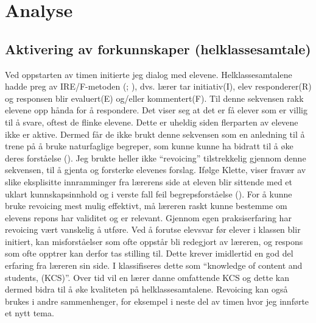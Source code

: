 \documentclass[main.tex]{subfiles}
\begin{document}
\section*{Analyse}
\label{sec:2}

\subsection*{Aktivering av forkunnskaper (helklassesamtale)}
Ved oppstarten av timen initierte jeg dialog med elevene. Helklassesamtalene hadde preg av
IRE/F-metoden (; ), dvs. lærer tar initiativ(I), elev 
responderer(R) og responsen blir evaluert(E) og/eller kommentert(F). Til denne sekvensen rakk 
elevene opp hånda for å respondere. Det viser seg at det er få elever som er villig til å svare, 
oftest de flinke elevene. Dette er uheldig siden flerparten av elevene ikke er aktive. Dermed 
får de ikke brukt denne sekvensen som en anledning til å trene på å bruke naturfaglige begreper, 
som kunne kunne ha bidratt til å øke deres forståelse ().
\newline
\newline
Jeg brukte heller ikke ``revoicing'' tilstrekkelig gjennom denne sekvensen, til å gjenta og 
forsterke elevenes forslag. Ifølge Klette, viser fravær av slike eksplisitte 
innramminger fra lærerens side at eleven blir sittende med et uklart kunnskapsinnhold og i 
verste fall feil begrepsforståelse (). For å kunne bruke revoicing 
mest mulig effektivt, må læreren raskt kunne bestemme om elevens repons har validitet 
og er relevant. Gjennom egen praksiserfaring har revoicing vært vanskelig å utføre.
Ved å forutse elevsvar før elever i klassen blir initiert, kan misforståelser som ofte oppstår bli 
redegjort av læreren, og respons som ofte opptrer kan derfor tas stilling til. Dette krever imidlertid 
en god del erfaring fra læreren sin side. I  klassifiseres dette som 
``knowledge of content and students, (KCS)''. Over tid vil en lærer danne omfattende KCS og
dette kan dermed bidra til å øke kvaliteten på helklassesamtalene. Revoicing kan også brukes
i andre sammenhenger, for eksempel i neste del av timen hvor jeg innførte et nytt tema. 
\end{document}
